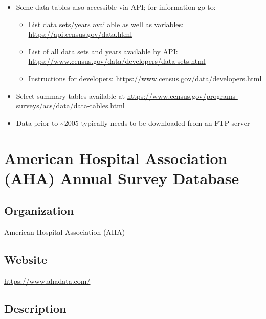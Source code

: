 \documentclass[
]{book}
\providecommand{\tightlist}{%
  \setlength{\itemsep}{0pt}\setlength{\parskip}{0pt}}
\begin{document}
\begin{itemize}
\tightlist
\item
  Some data tables also accessible via API; for information go to:

  \begin{itemize}
  \tightlist
  \item
    List data sets/years available as well as variables: \url{https://api.census.gov/data.html}
  \item
    List of all data sets and years available by API: \url{https://www.census.gov/data/developers/data-sets.html}
  \item
    Instructions for developers: \url{https://www.census.gov/data/developers.html}
  \end{itemize}
\item
  Select summary tables available at \url{https://www.census.gov/programs-surveys/acs/data/data-tables.html}
\item
  Data prior to \textasciitilde2005 typically needs to be downloaded from an FTP server
\end{itemize}

\mainmatter

\hypertarget{american-hospital-association-aha-annual-survey-database}{%
\chapter{American Hospital Association (AHA) Annual Survey Database}\label{american-hospital-association-aha-annual-survey-database}}

\hypertarget{organization-6}{%
\section{Organization}\label{organization-6}}

American Hospital Association (AHA)

\hypertarget{website-6}{%
\section{Website}\label{website-6}}

\url{https://www.ahadata.com/}

\hypertarget{description-6}{%
\section{Description}\label{description-6}}
\end{document}
